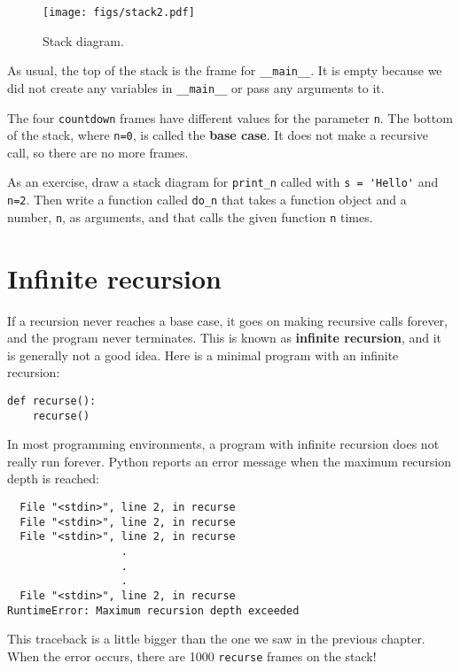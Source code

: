\begin{figure}
\centerline
{\texttt{[image: figs/stack2.pdf]}}
\caption{Stack diagram.}
\label{fig.stack2}
\end{figure}


As usual, the top of the stack is the frame for \verb"__main__".
It is empty because we did not create any variables in 
\verb"__main__" or pass any arguments to it.

The four {\tt countdown} frames have different values for the
parameter {\tt n}.  The bottom of the stack, where {\tt n=0}, is
called the {\bf base case}.  It does not make a recursive call, so
there are no more frames.

As an exercise, draw a stack diagram for \verb"print_n" called with
\verb"s = 'Hello'" and {\tt n=2}.
Then write a function called \verb"do_n" that takes a function
object and a number, {\tt n}, as arguments, and that calls
the given function {\tt n} times.


\section{Infinite recursion}

If a recursion never reaches a base case, it goes on making
recursive calls forever, and the program never terminates.  This is
known as {\bf infinite recursion}, and it is generally not
a good idea.  Here is a minimal program with an infinite recursion:

\begin{verbatim}
def recurse():
    recurse()
\end{verbatim}
%
In most programming environments, a program with infinite recursion
does not really run forever.  Python reports an error
message when the maximum recursion depth is reached:

\begin{verbatim}
  File "<stdin>", line 2, in recurse
  File "<stdin>", line 2, in recurse
  File "<stdin>", line 2, in recurse
                  .   
                  .
                  .
  File "<stdin>", line 2, in recurse
RuntimeError: Maximum recursion depth exceeded
\end{verbatim}
%
This traceback is a little bigger than the one we saw in the
previous chapter.  When the error occurs, there are 1000
{\tt recurse} frames on the stack!

